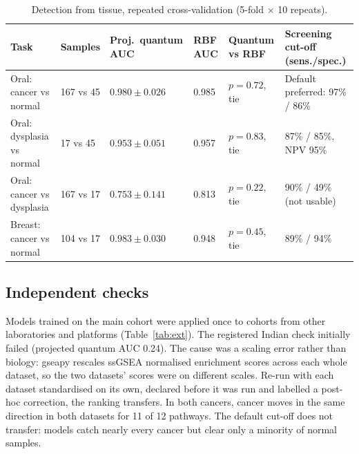 \documentclass[11pt,a4paper]{article}
\begin{document}
\begin{table}[H]
\centering
\caption{Detection from tissue, repeated cross-validation (5-fold $\times$ 10 repeats).}
\label{tab:det}
\small
\begin{tabularx}{\textwidth}{@{}Y l l l l Y@{}}
\toprule
\textbf{Task} & \textbf{Samples} & \textbf{Proj.\ quantum AUC} & \textbf{RBF AUC} & \textbf{Quantum vs RBF} & \textbf{Screening cut-off (sens./spec.)} \\
\midrule
Oral: cancer vs normal & 167 vs 45 & $0.980 \pm 0.026$ & 0.985 & $p=0.72$, tie & Default preferred: 97\% / 86\% \\
Oral: dysplasia vs normal & 17 vs 45 & $0.953 \pm 0.051$ & 0.957 & $p=0.83$, tie & 87\% / 85\%, NPV 95\% \\
Oral: cancer vs dysplasia & 167 vs 17 & $0.753 \pm 0.141$ & 0.813 & $p=0.22$, tie & 90\% / 49\% (not usable) \\
Breast: cancer vs normal & 104 vs 17 & $0.983 \pm 0.030$ & 0.948 & $p=0.45$, tie & 89\% / 94\% \\
\bottomrule
\end{tabularx}
\end{table}

\subsection{Independent checks}
Models trained on the main cohort were applied once to cohorts from other laboratories and platforms (Table~\ref{tab:ext}). The registered Indian check initially failed (projected quantum AUC 0.24). The cause was a scaling error rather than biology: gseapy rescales ssGSEA normalised enrichment scores across each whole dataset, so the two datasets' scores were on different scales. Re-run with each dataset standardised on its own, declared before it was run and labelled a post-hoc correction, the ranking transfers. In both cancers, cancer moves in the same direction in both datasets for 11 of 12 pathways. The default cut-off does not transfer: models catch nearly every cancer but clear only a minority of normal samples.
\end{document}
